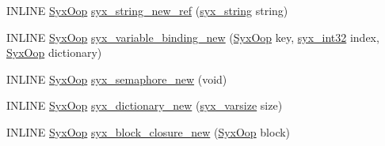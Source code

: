 \begin{CompactItemize}
\item 
INLINE \hyperlink{syx-types_8h_1121caba2d40b2ce090b640762744ccd}{SyxOop} \hyperlink{syx-object_8h_014aa4f99148b5e1a79b34553f022a59}{syx\_\-string\_\-new\_\-ref} (\hyperlink{syx-types_8h_1bff1fd86072dd98849437bc9dcb35c3}{syx\_\-string} string)
\item 
INLINE \hyperlink{syx-types_8h_1121caba2d40b2ce090b640762744ccd}{SyxOop} \hyperlink{syx-object_8h_d806df239dc9f2669f3620623ec77c6f}{syx\_\-variable\_\-binding\_\-new} (\hyperlink{syx-types_8h_1121caba2d40b2ce090b640762744ccd}{SyxOop} key, \hyperlink{syx-types_8h_9f31c17555a2dfcf25da84b5c4a2e55b}{syx\_\-int32} index, \hyperlink{syx-types_8h_1121caba2d40b2ce090b640762744ccd}{SyxOop} dictionary)
\item 
INLINE \hyperlink{syx-types_8h_1121caba2d40b2ce090b640762744ccd}{SyxOop} \hyperlink{syx-object_8h_1e80c1b5431ace50da81cf2ed99377c0}{syx\_\-semaphore\_\-new} (void)
\item 
INLINE \hyperlink{syx-types_8h_1121caba2d40b2ce090b640762744ccd}{SyxOop} \hyperlink{syx-object_8h_cdaeef35d6b8e61ddf3034ecb35c827b}{syx\_\-dictionary\_\-new} (\hyperlink{syx-types_8h_18e1a1417591a1efb670b97ce320f535}{syx\_\-varsize} size)
\item 
INLINE \hyperlink{syx-types_8h_1121caba2d40b2ce090b640762744ccd}{SyxOop} \hyperlink{syx-object_8h_cb77fae0f91d128285e504c1959f9fc9}{syx\_\-block\_\-closure\_\-new} (\hyperlink{syx-types_8h_1121caba2d40b2ce090b640762744ccd}{SyxOop} block)
\end{CompactItemize}
